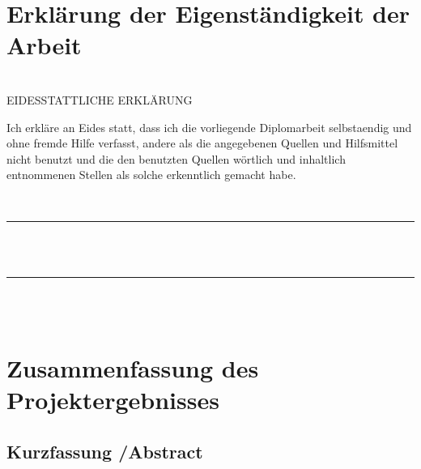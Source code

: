 \documentclass[12pt,a4paper]{article}
\newcommand{\mylinespacing}[0]{\onehalfspace}	%
\begin{document}
\mylinespacing
{




\newpage%

\section*{\Large\sc Erklärung der Eigenständigkeit der Arbeit}
	\hfill\\[ 8mm]
	EIDESSTATTLICHE ERKLÄRUNG
	\\[3mm]
\begin{spacing}{1.5}
	\noindent%
	Ich erkläre an Eides statt, dass ich die vorliegende Diplomarbeit selbstaendig und
	ohne fremde Hilfe verfasst, andere als die angegebenen Quellen und Hilfsmittel
	nicht benutzt und die den benutzten Quellen wörtlich und inhaltlich entnommenen
	Stellen als solche erkenntlich gemacht habe.
\end{spacing}\hfill
	\\[12mm]
	\parbox[b]{52mm}{
		\rule{50mm}{0.2pt}\rule{0pt}{25mm}
		\\\hspace*{6mm}{Ort, Datum}
		\\[0mm]
	}
	\hfill
	\parbox[b]{72mm}{
		\rule{70mm}{0.2pt}\rule{0pt}{25mm}
		\\\hspace*{6mm}{Verfasser, Verfasserinnen}
		\\\hspace*{6mm}{Vor- und Zunamen}
	}







\newpage
\section{Zusammenfassung des Projektergebnisses}
 \subsection{Kurzfassung /Abstract}
 
}
\end{document}
